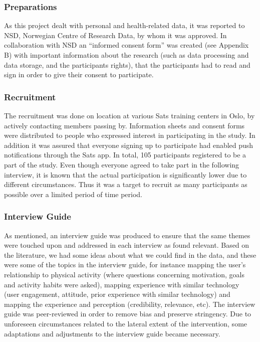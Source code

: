         \subsubsection{Preparations}
        As this project dealt with personal and health-related data, it was reported to NSD, Norwegian Centre of Research Data, by whom it was approved. In collaboration with NSD an “informed consent form” was created (see Appendix B) with important information about the research (such as data processing and data storage, and the participants rights), that the participants had to read and sign in order to give their consent to participate. 
        
        \subsubsection{Recruitment}
        The recruitment was done on location at various Sats training centers in Oslo, by actively contacting members passing by. Information sheets and consent forms were distributed to people who expressed interest in participating in the study. In addition it was assured that everyone signing up to participate had enabled push notifications through the Sats app. In total, 105 participants registered to be a part of the study. Even though everyone agreed to take part in the following interview, it is known that the actual participation is significantly lower due to different circumstances. Thus it was a target to recruit  as  many participants as possible over a limited period of time period.
        
        
        \subsubsection{Interview Guide}
	    As mentioned, an interview guide was produced to ensure that the same themes were touched upon and addressed in each interview as found relevant. Based on the literature, we had some ideas about what we could find in the data, and these were some of the topics in the interview guide, for instance mapping the user’s relationship to physical activity (where questions concerning motivation, goals and activity habits were asked), mapping experience with similar technology (user engagement, attitude, prior experience with similar technology) and mapping the experience and perception (credibility, relevance, etc).  The interview guide was peer-reviewed in order to remove bias and preserve stringency. Due to unforeseen circumstances related to the lateral extent of the intervention, some adaptations and adjustments to the interview guide became necessary. 
        
